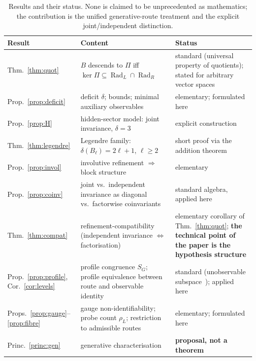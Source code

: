 \documentclass[11pt,a4paper]{article}
\newcommand{\Rad}{\operatorname{Rad}}
\newcommand{\defic}{\delta}
\theoremstyle{plain}
\theoremstyle{definition}
\begin{document}
\begin{table}[t]
\centering\small
\begin{tabularx}{\textwidth}{@{}l>{\raggedright\arraybackslash}X>{\raggedright\arraybackslash}p{}@{}}
\toprule
Result & Content & Status\\
\midrule
Thm.~\ref{thm:quot} & $B$ descends to $\Pi$ iff $\ker\Pi\subseteq\Rad_L\cap\Rad_R$ & standard (universal property of quotients); stated for arbitrary vector spaces\\
Prop.~\ref{prop:deficit} & deficit $\defic$; bounds; minimal auxiliary observables & elementary; formulated here\\
Prop.~\ref{prop:H} & hidden-sector model: joint invariance, $\defic=3$ & explicit construction\\
Thm.~\ref{thm:legendre} & Legendre family: $\defic(B_\ell)=2\ell+1$, $\ell\ge2$ & short proof via the addition theorem\\
Prop.~\ref{prop:invol} & involutive refinement $\Rightarrow$ block structure & elementary\\
Prop.~\ref{prop:coinv} & joint vs.\ independent invariance as diagonal vs.\ factorwise coinvariants & standard algebra, applied here\\
Thm.~\ref{thm:compat} & refinement-compatibility (independent invariance $\Leftrightarrow$ factorisation) & elementary corollary of Thm.~\ref{thm:quot}; \textbf{the technical point of the paper is the hypothesis structure}\\
Prop.~\ref{prop:profile}, Cor.~\ref{cor:levels} & profile congruence $S_G$; profile equivalence between route and observable identity & standard (unobservable subspace~\cite{Kal60}); applied here\\
Props.~\ref{prop:gauge}--\ref{prop:fibre} & gauge non-identifiability; probe count $\rho_L$; restriction to admissible routes & elementary; formulated here\\
Princ.~\ref{princ:gen} & generative characterisation & \textbf{proposal, not a theorem}\\
\bottomrule
\end{tabularx}
\caption{Results and their status. None is claimed to be unprecedented as mathematics; the contribution is the unified generative-route treatment and the explicit joint/independent distinction.}\label{tab:results}
\end{table}
\end{document}
